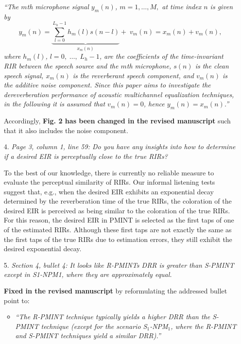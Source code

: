 \documentclass[10pt, a4paper]{article}
\begin{document}
\begin{itemize}
{\emph{``The $m$th microphone signal $y_m(n)$, $m = 1, \ldots, M,$ at time index $n$ is given by 
\begin{equation}
y_m(n) = \underbrace{\sum_{l = 0}^{L_h-1}h_m(l)s(n-l)}_{x_m(n)} + \; v_m(n) = x_m(n) + v_m(n),
\end{equation}
where $h_m(l)$, $l = 0, \; \ldots, \; L_h-1$, are the coefficients of the time-invariant RIR between the speech source and the $m$th microphone, $s(n)$ is the clean speech signal, $x_m(n)$ is the reverberant speech component, and $v_m(n)$ is the additive noise component.
Since this paper aims to investigate the dereverberation performance of acoustic multichannel equalization techniques, in the following it is assumed that $v_m(n) = 0$, hence $y_m(n) = x_m(n)$.''}}

Accordingly, {\textbf{Fig. 2 has been changed in the revised manuscript}} such that it also includes the noise component.

\item[4.] {\textit{Page 3, column 1, line 59: Do you have any insights into how to determine if a desired EIR is perceptually close to the true RIRs?}}

To the best of our knowledge, there is currently no reliable measure to evaluate the perceptual similarity of RIRs.
Our informal listening tests suggest that, e.g., when the desired EIR exhibits an exponential decay determined by the reverberation time of the true RIRs, the coloration of the desired EIR is perceived as being similar to the coloration of the true RIRs.
For this reason, the desired EIR in PMINT is selected as the first taps of one of the estimated RIRs. 
Although these first taps are not exactly the same as the first taps of the true RIRs due to estimation errors, they still exhibit the desired exponential decay.

\item[5.] {\textit{Section 4, bullet 4: It looks like R-PMINTs DRR is greater than S-PMINT except in S1-NPM1, where they are approximately equal.}}

{\textbf{Fixed in the revised manuscript}} by reformulating the addressed bullet point to:

\begin{itemize}
\item {\emph{``The R-PMINT technique typically yields a higher DRR than the S-PMINT technique (except for the scenario S$_1$-NPM$_1$, where the R-PMINT and S-PMINT techniques yield a similar DRR).''}}
\end{itemize}


\end{itemize}
\end{document}
